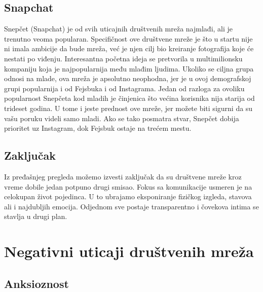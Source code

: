 \documentclass[a4paper]{article}
\begin{document}
{		\subsection{Snapchat}
		\label{subsec:podnaslov4}
		Snepčet (Snapchat) je od svih uticajnih društvenih mreža najmlađi, ali je trenutno veoma popularan. Specifičnost ove društvene mreže je što u startu nije ni imala ambicije da bude mreža, već je njen cilj bio kreiranje fotografija koje će nestati po viđenju. Interesantna početna ideja se pretvorila u multimilionsku kompaniju koja je najpopularnija među mlađim ljudima. Ukoliko se ciljna grupa odnosi na mlade, ova mreža je apsolutno neophodna, jer je u ovoj demografskoj grupi popularnija i od Fejsbuka i od Instagrama. Jedan od razloga za ovoliku popularnost Snepčeta kod mladih je činjenica što većina korisnika nija starija od trideset godina. U tome i jeste prednost ove mreže, jer možete biti sigurni da su vašu poruku videli samo mladi. Ako se tako posmatra stvar, Snepčet dobija prioritet uz Instagram, dok Fejsbuk ostaje na trećem mestu.
		\subsection{Zaključak}
		\label{subsec:podnaslov5}
		Iz pređašnjeg pregleda možemo izvesti zaključak da su društvene mreže kroz vreme dobile jedan potpuno drugi smisao. Fokus sa komunikacije usmeren je na celokupan život pojedinca. U to ubrajamo eksponiranje fizičkog izgleda, stavova ali i najdubljih emocija. Odjednom sve postaje transparentno i čovekova intima se stavlja u drugi plan.
		
		
		\section{Negativni uticaji društvenih mreža}	
		\label{sec:termini_i_citiranje}
		\subsection{Anksioznost}
		\label{subsec:podnaslov4}
		
}
\end{document}

